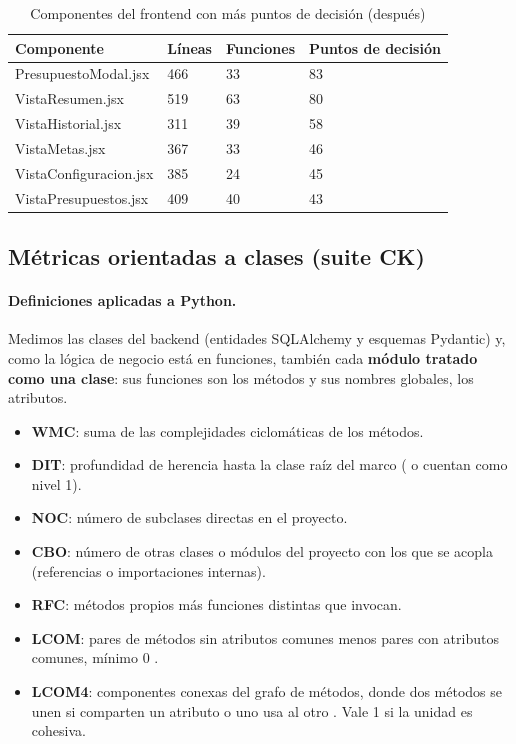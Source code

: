 \begin{table}[H]
\caption{Componentes del frontend con más puntos de decisión (después)}
\label{tab:frontend}
\footnotesize
\begin{tabularx}{\linewidth}{L{4.6cm} Y Y Y}
\toprule
Componente & Líneas & Funciones & Puntos de decisión \\
\midrule
PresupuestoModal.jsx & 466 & 33 & 83 \\
VistaResumen.jsx & 519 & 63 & 80 \\
VistaHistorial.jsx & 311 & 39 & 58 \\
VistaMetas.jsx & 367 & 33 & 46 \\
VistaConfiguracion.jsx & 385 & 24 & 45 \\
VistaPresupuestos.jsx & 409 & 40 & 43 \\
\bottomrule
\end{tabularx}
\end{table}

\subsection{Métricas orientadas a clases (suite CK)}

\paragraph{Definiciones aplicadas a Python.} Medimos las clases del backend (entidades SQLAlchemy y esquemas Pydantic) y, como la lógica de negocio está en funciones, también cada \textbf{módulo tratado como una clase}: sus funciones son los métodos y sus nombres globales, los atributos.
\begin{itemize}
  \item \textbf{WMC}: suma de las complejidades ciclomáticas de los métodos.
  \item \textbf{DIT}: profundidad de herencia hasta la clase raíz del marco ( o  cuentan como nivel 1).
  \item \textbf{NOC}: número de subclases directas en el proyecto.
  \item \textbf{CBO}: número de otras clases o módulos del proyecto con los que se acopla (referencias o importaciones internas).
  \item \textbf{RFC}: métodos propios más funciones distintas que invocan.
  \item \textbf{LCOM}: pares de métodos sin atributos comunes menos pares con atributos comunes, mínimo 0 \parencite{chidamber1994}.
  \item \textbf{LCOM4}: componentes conexas del grafo de métodos, donde dos métodos se unen si comparten un atributo o uno usa al otro \parencite{hitz1995}. Vale 1 si la unidad es cohesiva.
\end{itemize}

